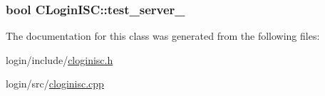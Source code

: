 \subsubsection[{\texorpdfstring{test\+\_\+server\+\_\+}{test_server_}}]{\setlength{\rightskip}{0pt plus 5cm}bool C\+Login\+I\+S\+C\+::test\+\_\+server\+\_\+\hspace{0.3cm}{\ttfamily [protected]}}\hypertarget{classCLoginISC_a501d8b74de330738e1fc7c11dcec14c5}{}\label{classCLoginISC_a501d8b74de330738e1fc7c11dcec14c5}


The documentation for this class was generated from the following files\+:\begin{DoxyCompactItemize}
\item 
login/include/\hyperlink{cloginisc_8h}{cloginisc.\+h}\item 
login/src/\hyperlink{cloginisc_8cpp}{cloginisc.\+cpp}\end{DoxyCompactItemize}
